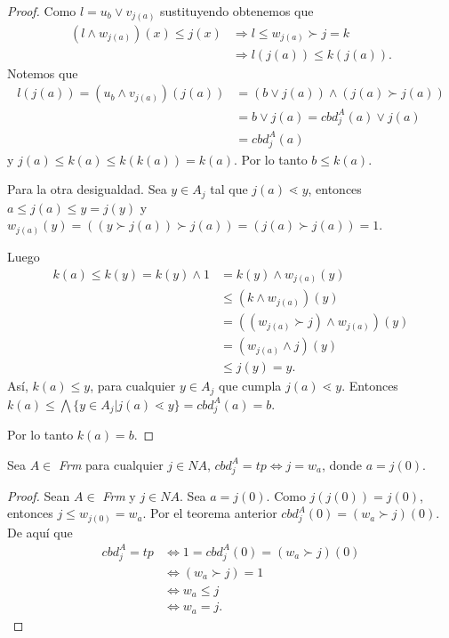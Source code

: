 \begin{proof}
Como $l=u_b\vee v_{j(a)}$ sustituyendo obtenemos que 
\begin{equation*}
\begin{split}
(l\wedge w_{j(a)})(x)\leq j(x) & \Rightarrow l\leq w_{j(a)}\succ j=k\\
& \Rightarrow l(j(a))\leq k(j(a)).
\end{split}
\end{equation*}
Notemos que 
\begin{equation*}
\begin{split}
l(j(a))=(u_b\wedge v_{j(a)})(j(a))& =(b\vee j(a))\wedge (j(a)\succ j(a))\\
& =b\vee j(a)=cbd_j^A(a)\vee j(a)\\
& =cbd_j^A(a)
\end{split}
\end{equation*}
y $j(a)\leq k(a)\leq k(k(a))=k(a)$. Por lo tanto $b\leq k(a)$.

Para la otra desigualdad. Sea $y\in A_j$ tal que $j(a)\lessdot y$, entonces $a\leq j(a)\leq y=j(y)$ y $w_{j(a)}(y)=((y\succ j(a))\succ j(a))=(j(a)\succ j(a))=1$.

Luego 
\begin{equation*}
\begin{split}
k(a)\leq k(y)=k(y)\wedge 1 & =k(y)\wedge w_{j(a)}(y)\\
& \leq (k\wedge w_{j(a)})(y)\\
& =((w_{j(a)}\succ j)\wedge w_{j(a)})(y)\\
& =(w_{j(a)}\wedge j)(y)\\
& \leq j(y)=y.
\end{split}
\end{equation*}
Así, $k(a)\leq y$, para cualquier $y\in A_j$ que cumpla $j(a)\lessdot y$. Entonces $k(a)\leq \bigwedge\{y\in A_j|j(a)\lessdot y\}=cbd_j^A(a)=b$.

\noindent
Por lo tanto $k(a)=b$.
\end{proof}

\begin{cor}
Sea $A\in$ \textit{Frm} para cualquier $j\in NA$, $cbd_j^A=tp\Leftrightarrow j=w_a$, donde $a=j(0)$.
\end{cor}

\begin{proof}
Sean $A\in$ \textit{Frm} y $j\in NA$. Sea $a=j(0)$. Como $j(j(0))=j(0)$, entonces $j\leq w_{j(0)}=w_a$. Por el teorema anterior $cbd_j^A(0)=(w_a\succ j)(0)$. De aquí que
\begin{equation*}
\begin{split}
cbd_j^A=tp & \Leftrightarrow 1=cbd_j^A(0)=(w_a\succ j)(0)\\
& \Leftrightarrow (w_a\succ j)=1\\ 
& \Leftrightarrow w_a\leq j\\
& \Leftrightarrow w_a=j.
\end{split}
\end{equation*}

\end{proof}

